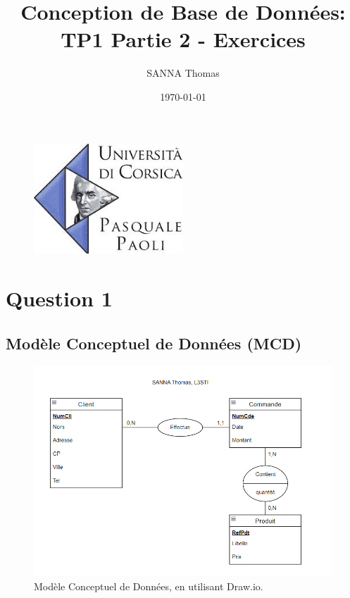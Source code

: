 \documentclass{article}
\title{Conception de Base de Données: \\ TP1 Partie 2 - Exercices}
\author{SANNA Thomas}
\date{\today}
\begin{document}
\begin{figure}
  \centering
  \includegraphics[width=0.5\textwidth]{img/logoUniv.jpg}
  \label{fig:mysql-logo}
\end{figure}

\maketitle

\break\tableofcontents

\break\section{Question 1}

\subsection{Modèle Conceptuel de Données (MCD)}

\begin{figure}[H]
  \centering
  \includegraphics[width=1\textwidth]{graphs/mcd.png}
  \caption{Modèle Conceptuel de Données, en utilisant Draw.io.}
  \label{fig:MCD}
\end{figure}
\end{document}
